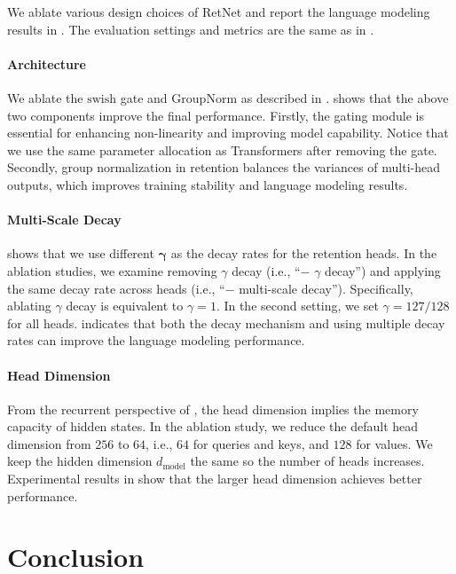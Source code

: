 \documentclass{article}
\newcommand\our{RetNet}
\begin{document}
We ablate various design choices of \our{} and report the language modeling results in .
The evaluation settings and metrics are the same as in .

\paragraph{Architecture}
We ablate the $\mathrm{swish}$ gate and $\mathrm{GroupNorm}$ as described in .
 shows that the above two components improve the final performance.
Firstly, the gating module is essential for enhancing non-linearity and improving model capability. Notice that we use the same parameter allocation as Transformers after removing the gate.
Secondly, group normalization in retention balances the variances of multi-head outputs, which improves training stability and language modeling results.

\paragraph{Multi-Scale Decay}
 shows that we use different $\mathbf{\gamma}$ as the decay rates for the retention heads.
In the ablation studies, we examine removing $\gamma$ decay (i.e., ``$-$ $\gamma$ decay'') and applying the same decay rate across heads (i.e., ``$-$ multi-scale decay'').
Specifically, ablating $\gamma$ decay is equivalent to $\gamma = 1$.
In the second setting, we set $\gamma = 127/128$ for all heads.
 indicates that both the decay mechanism and using multiple decay rates can improve the language modeling performance.

\paragraph{Head Dimension}
From the recurrent perspective of , the head dimension implies the memory capacity of hidden states.
In the ablation study, we reduce the default head dimension from $256$ to $64$, i.e., $64$ for queries and keys, and $128$ for values.
We keep the hidden dimension $d_\text{model}$ the same so the number of heads increases.
Experimental results in  show that the larger head dimension achieves better performance.


\section{Conclusion}
\end{document}
